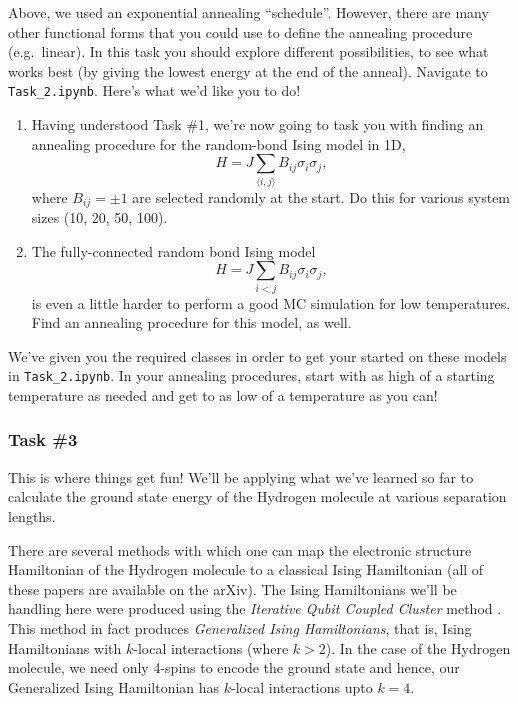 \documentclass[12pt]{article}
\begin{document}
Above, we used an exponential annealing ``schedule''.  However, there are many other functional forms that you could use to define the annealing procedure (e.g.~linear).
In this task you should explore different possibilities, to see what works best (by giving the lowest energy at the end of the anneal).
Navigate to \texttt{Task\_2.ipynb}. Here's what we'd like you to do!
\begin{enumerate}
    \item Having understood Task \#1, we're now going to task you with finding an annealing procedure for the random-bond Ising model in 1D,
    \begin{equation}
        H = J\sum_{\langle i,j \rangle} B_{ij}\sigma_i\sigma_j,
    \end{equation}
    where $B_{ij} = \pm 1$ are selected randomly at the start. Do this for various system sizes (10, 20, 50, 100).
    \item The fully-connected random bond Ising model
    \begin{equation}
        H = J \sum_{i < j} B_{ij}\sigma_i\sigma_j,
    \end{equation}
    is even a little harder to perform a good MC simulation for low temperatures. Find an annealing procedure for this model, as well.
\end{enumerate}
We've given you the required classes in order to get your started on these models in \texttt{Task\_2.ipynb}. In your annealing procedures, start with as high of a starting temperature as needed and get to as low of a temperature as you can!

\subsubsection*{Task \#3}
This is where things get fun!
We'll be applying what we've learned so far to calculate the ground state energy
of the Hydrogen molecule at various separation lengths.

There are several methods with which one can map the electronic structure Hamiltonian
of the Hydrogen molecule to a classical Ising Hamiltonian
\cite{iqcc,qcc,xia2016electronic,xia2017electronic} (all of these papers are available on the arXiv).
The Ising Hamiltonians we'll be handling here were produced using the
\textit{Iterative Qubit Coupled Cluster} method \cite{iqcc}. This method
in fact produces \textit{Generalized Ising Hamiltonians}, that is, Ising
Hamiltonians with $k$-local interactions (where $k > 2$).
In the case of the Hydrogen molecule, we need only 4-spins to encode the ground state and
hence, our Generalized Ising Hamiltonian has $k$-local interactions upto $k=4$.
\end{document}
